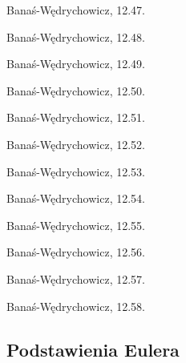 \begin{integral}
    Banaś-Wędrychowicz, 12.47.
\end{integral}

\begin{integral}
    Banaś-Wędrychowicz, 12.48.
\end{integral}

\begin{integral}
    Banaś-Wędrychowicz, 12.49.
\end{integral}

\begin{integral}
    Banaś-Wędrychowicz, 12.50.
\end{integral}

\begin{integral}
    Banaś-Wędrychowicz, 12.51.
\end{integral}

\begin{integral}
    Banaś-Wędrychowicz, 12.52.
\end{integral}

\begin{integral}
    Banaś-Wędrychowicz, 12.53.
\end{integral}

\begin{integral}
    Banaś-Wędrychowicz, 12.54.
\end{integral}

\begin{integral}
    Banaś-Wędrychowicz, 12.55.
\end{integral}

\begin{integral}
    Banaś-Wędrychowicz, 12.56.
\end{integral}

\begin{integral}
    Banaś-Wędrychowicz, 12.57.
\end{integral}

\begin{integral}
    Banaś-Wędrychowicz, 12.58.
\end{integral}

\subsection{Podstawienia Eulera}

